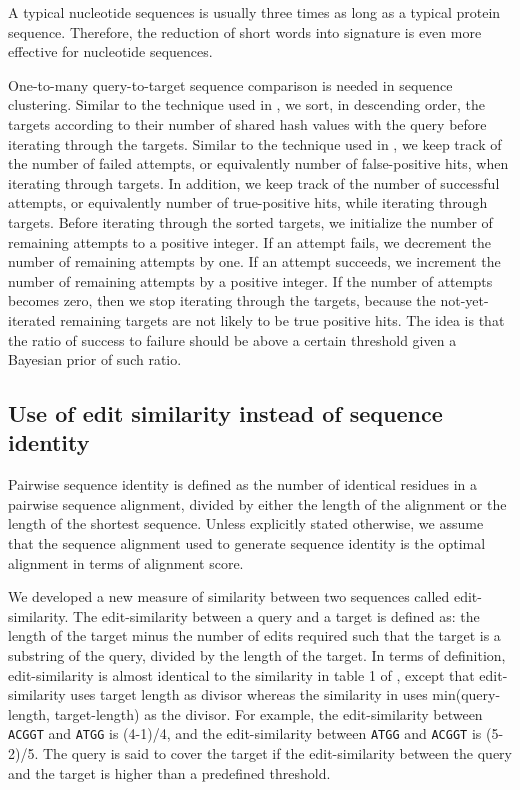 \documentclass[11pt,letterpaper]{article}
\begin{document}
A typical nucleotide sequences is usually three times as long as a typical protein sequence.
Therefore, the reduction of short words into signature is even more effective for nucleotide sequences.

One-to-many query-to-target sequence comparison is needed in sequence clustering. 
Similar to the technique used in \citet{li2006cd}, we sort, in descending order, the targets according to their number of shared hash values with the query before iterating through the targets. 
Similar to the technique used in \citet{edgar2010search}, we keep track of the number of failed attempts, or equivalently number of false-positive hits, when iterating through targets.
In addition, we keep track of the number of successful attempts, or equivalently number of true-positive hits, while iterating through targets.
Before iterating through the sorted targets, we initialize the number of remaining attempts to a positive integer.
If an attempt fails, we decrement the number of remaining attempts by one.
If an attempt succeeds, we increment the number of remaining attempts by a positive integer.
If the number of attempts becomes zero, then we stop iterating through the targets, because the not-yet-iterated remaining targets are not likely to be true positive hits.
The idea is that the ratio of success to failure should be above a certain threshold given a Bayesian prior of such ratio.

\subsection{Use of edit similarity instead of sequence identity}

Pairwise sequence identity is defined as the number of identical residues in a pairwise sequence alignment, divided by either the length of the alignment or the length of the shortest sequence. 
Unless explicitly stated otherwise, we assume that the sequence alignment used to generate sequence identity is the optimal alignment in terms of alignment score.

We developed a new measure of similarity between two sequences called edit-similarity.
The edit-similarity between a query and a target is defined as: the length of the target minus the number of edits required such that the target is a substring of the query, divided by the length of the target.
In terms of definition, edit-similarity is almost identical to the similarity in table 1 of \cite{vsovsic2017edlib}, 
except that edit-similarity uses target length as divisor whereas the similarity in \cite{vsovsic2017edlib} uses min(query-length, target-length) as the divisor. 
For example, the edit-similarity between \texttt{ACGGT} and \texttt{ATGG} is (4-1)/4, and the edit-similarity between \texttt{ATGG} and \texttt{ACGGT} is (5-2)/5.
The query is said to cover the target if the edit-similarity between the query and the target is higher than a predefined threshold.
\end{document}
